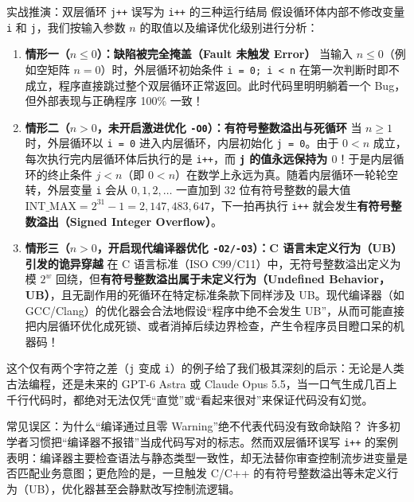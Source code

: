 \documentclass[a4paper]{article}
\begin{document}
\begin{knowledgebox}{实战推演：双层循环 \texttt{j++} 误写为 \texttt{i++} 的三种运行结局}
假设循环体内部不修改变量 \texttt{i} 和 \texttt{j}，我们按输入参数 $n$ 的取值以及编译优化级别进行分析：
\begin{enumerate}
    \item \textbf{情形一（$n \le 0$）：缺陷被完全掩盖（Fault 未触发 Error）}
    当输入 $n \le 0$（例如空矩阵 $n = 0$）时，外层循环初始条件 \texttt{i = 0; i < n} 在第一次判断时即不成立，程序直接跳过整个双层循环正常返回。此时代码里明明躺着一个 Bug，但外部表现与正确程序 100\% 一致！
    \item \textbf{情形二（$n > 0$，未开启激进优化 \texttt{-O0}）：有符号整数溢出与死循环}
    当 $n \ge 1$ 时，外层循环以 \texttt{i = 0} 进入内层循环，内层初始化 \texttt{j = 0}。由于 $0 < n$ 成立，每次执行完内层循环体后执行的是 \texttt{i++}，而 \textbf{\texttt{j} 的值永远保持为 $0$}！于是内层循环的终止条件 $j < n$（即 $0 < n$）在数学上永远为真。随着内层循环一轮轮空转，外层变量 \texttt{i} 会从 $0, 1, 2, \dots$ 一直加到 32 位有符号整数的最大值 $\text{INT\_MAX} = 2^{31} - 1 = 2,147,483,647$，下一拍再执行 \texttt{i++} 就会发生\textbf{有符号整数溢出（Signed Integer Overflow）}。
    \item \textbf{情形三（$n > 0$，开启现代编译器优化 \texttt{-O2/-O3}）：C 语言未定义行为（UB）引发的诡异穿越}
    在 C 语言标准（ISO C99/C11）中，无符号整数溢出定义为模 $2^w$ 回绕，但\textbf{有符号整数溢出属于未定义行为（Undefined Behavior，UB）}，且无副作用的死循环在特定标准条款下同样涉及 UB。现代编译器（如 GCC/Clang）的优化器会合法地假设“程序中绝不会发生 UB”，从而可能直接把内层循环优化成死锁、或者消掉后续边界检查，产生令程序员目瞪口呆的机器码！
\end{enumerate}
\end{knowledgebox}

这个仅有两个字符之差（\texttt{j} 变成 \texttt{i}）的例子给了我们极其深刻的启示：无论是人类古法编程，还是未来的 GPT-6 Astra 或 Claude Opus 5.5，当一口气生成几百上千行代码时，都绝对无法仅凭“直觉”或“看起来很对”来保证代码没有幻觉。

\begin{warningbox}{常见误区：为什么“编译通过且零 Warning”绝不代表代码没有致命缺陷？}
许多初学者习惯把“编译器不报错”当成代码写对的标志。然而双层循环误写 \texttt{i++} 的案例表明：编译器主要检查语法与静态类型一致性，却无法替你审查控制流步进变量是否匹配业务意图；更危险的是，一旦触发 C/C++ 的有符号整数溢出等未定义行为（UB），优化器甚至会静默改写控制流逻辑。
\end{warningbox}
\end{document}

